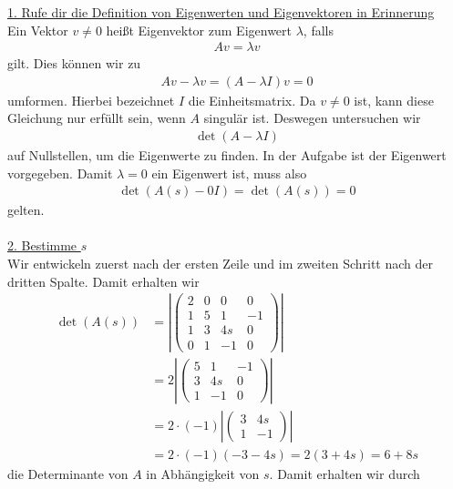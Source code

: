 \underline{1. Rufe dir die Definition von Eigenwerten und Eigenvektoren in Erinnerung}\\
Ein Vektor $v \neq 0$ heißt Eigenvektor zum Eigenwert $\lambda$,
falls
\begin{align*}
A v = \lambda v
\end{align*}
gilt.
Dies können wir zu 
\begin{align*}
A v - \lambda v = (A-\lambda I)v = 0
\end{align*}
umformen. 
Hierbei bezeichnet $I$ die Einheitsmatrix.
Da $v \neq 0$ ist, kann diese Gleichung nur erfüllt sein, wenn $A$ singulär ist.
Deswegen untersuchen wir
\begin{align*}
\det(A - \lambda I) 
\end{align*}
auf Nullstellen, um die Eigenwerte zu finden.
In der Aufgabe ist der Eigenwert vorgegeben. 
Damit $ \lambda = 0 $ ein Eigenwert ist, muss also
\begin{align*}
\det(A(s) - 0 I) = \det(A(s)) = 0
\end{align*}
gelten.\\
\\
\underline{2. Bestimme $s$}\\
Wir entwickeln zuerst nach der ersten Zeile und im zweiten Schritt nach der dritten Spalte.
Damit erhalten wir
\begin{equation*}
\begin{split}
\det(A(s))&=
\left| 
\begin{pmatrix}
2 & 0 &0 & 0 \\
1 & 5 & 1  & -1\\
1 & 3 & 4s & 0 \\
0 & 1 & -1 & 0
\end{pmatrix}
\right|\\
&=
2 
\left| 
\begin{pmatrix}
 5 & 1  & -1\\
 3 & 4s & 0 \\
 1 & -1 & 0
\end{pmatrix}
\right|\\
&= 
2 \cdot (-1) 
\left| 
\begin{pmatrix}
  3 & 4s  \\
 1 & -1 
\end{pmatrix}
\right|\\
&= 2 \cdot(-1) ( -3 - 4 s)
= 2( 3 + 4s) 
= 6 + 8s 
\end{split}
\end{equation*}
die Determinante von $A$ in Abhängigkeit von $s$.
Damit erhalten wir durch

